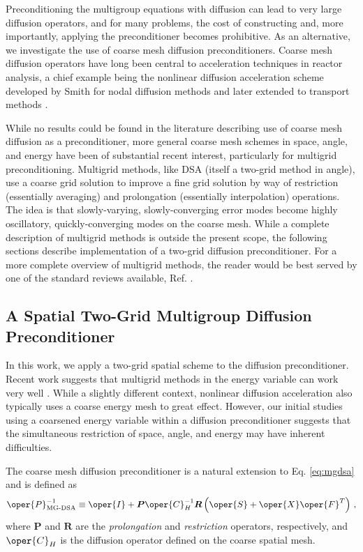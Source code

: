 Preconditioning the multigroup equations with diffusion can lead to 
very large diffusion operators, and for many problems, the cost of 
constructing and, more importantly, applying the preconditioner becomes
prohibitive.  As an alternative, we investigate the use of coarse mesh
diffusion preconditioners.  Coarse mesh diffusion operators have long been
central to acceleration techniques in reactor analysis, a chief 
example being the nonlinear diffusion acceleration scheme developed
by Smith \cite{smith1984nms} for nodal diffusion methods and later 
extended to transport methods \cite{smith2002fct}.  

While no results could be found in the literature describing use of 
coarse mesh diffusion as a preconditioner, more general coarse mesh 
schemes in space, angle, and energy have been of substantial recent 
interest, particularly for multigrid preconditioning.  
Multigrid methods, like DSA (itself a two-grid method in angle), use 
a coarse grid solution to improve a fine grid solution by way of 
restriction (essentially averaging) and prolongation (essentially
interpolation) operations.  The idea is that slowly-varying, 
slowly-converging error modes become highly oscillatory, quickly-converging 
modes on the coarse mesh. While a complete description of multigrid 
methods is outside the present scope, the following sections describe 
implementation of a two-grid diffusion preconditioner.  For a more 
complete overview of multigrid methods, the reader would be best 
served by one of the standard reviews 
available, \eg Ref. \cite{briggs2000amt}.  

\subsection{A Spatial Two-Grid Multigroup Diffusion Preconditioner}

In this work, we apply a two-grid spatial scheme to the diffusion 
preconditioner.  Recent 
work suggests that multigrid methods in the energy variable can work very 
well \cite{hamilton2011nsk, slaybaugh2013mep}.  While a slightly different 
context, nonlinear diffusion acceleration also typically uses a coarse 
energy mesh to great effect. However, our initial studies using a coarsened
energy variable within a diffusion preconditioner suggests that the 
simultaneous restriction of space, angle, and energy may have inherent 
difficulties.

The coarse mesh diffusion preconditioner is a natural extension 
to Eq. \ref{eq:mgdsa} and is defined as
\begin{equation}
   \oper{P}^{-1}_{\text{MG-DSA}} \equiv 
    \oper{I} + \bm{P}\oper{C}_H^{-1}\bm{R}
     \left(\oper{S} + \oper{X}\oper{F}^T\right) \, ,
\end{equation}
where $\bm{P}$ and $\bm{R}$ are the \emph{ prolongation} and 
\emph{ restriction} operators, respectively, and 
$\oper{C}_H$ is the diffusion operator defined on the coarse 
spatial mesh.  

